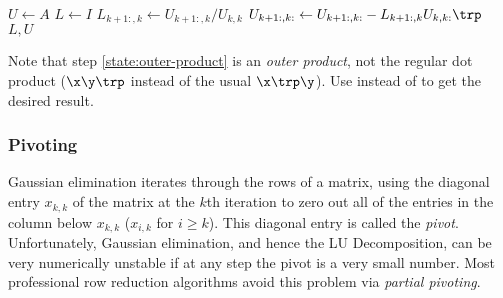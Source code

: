 \begin{algorithm}[H]
\begin{algorithmic}[1]
\State $U \gets A$
\State $L \gets I$
    \State $L_{k+1:,k} \gets U_{k+1:,k}/U_{k,k}$
    \State $U_{k+1:,k:} \gets U_{k+1:,k:} - L_{k+1:,k}U_{k,k:}\trp$
    \label{state:outer-product}
\EndFor
\State {} $L, U$
\EndProcedure
\end{algorithmic}
\caption{}
\end{algorithm}

Note that step \ref{state:outer-product} is an \emph{outer product}, not the regular dot product ($\x\y\trp$ instead of the usual $\x\trp\y$).
Use  instead of  to get the desired result.

\subsubsection*{Pivoting} %

Gaussian elimination iterates through the rows of a matrix, using the diagonal entry $x_{k,k}$ of the matrix at the $k$th iteration to zero out all of the entries in the column below $x_{k,k}$ ($x_{i,k}$ for $i\ge k$).
This diagonal entry is called the \emph{pivot}.
Unfortunately, Gaussian elimination, and hence the LU Decomposition, can be very numerically unstable if at any step the pivot is a very small number.
Most professional row reduction algorithms avoid this problem via \emph{partial pivoting}.

